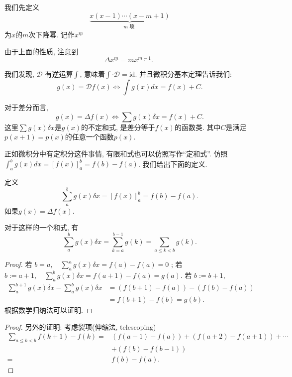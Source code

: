 \documentclass{ctexart}
\begin{document}
我们先定义
$$
	\underbrace{x(x-1) \cdots(x-m+1)}_{m \text { 项 }}
$$
为$x$的$m$次下降幂. 记作$x^{\underline m}$

\begin{proposition}
	由于上面的性质, 注意到
	$$
		\Delta x^{\underline{m}}=m x^{\underline{m-1}} \text {. }
	$$
\end{proposition}

我们发现, $\mathscr D$ 有逆运算$\int$, 意味着$\int \cdot \mathscr D=\text{id}$. 并且微积分基本定理告诉我们:
$$
	g(x)=\mathscr D f(x) \Leftrightarrow \int g(x) d x=f(x)+C .
$$

\begin{theorem}[差分基本定理] 对于差分而言,
	$$
		g(x)=\Delta f(x) \Leftrightarrow \sum g(x) \delta x=f(x)+C .
	$$
	这里$\sum g(x) \delta x$是$g(x)$的不定和式, 是差分等于$f(x)$的函数类. 其中$C$是满足$p(x+1)=p(x)$的任意一个函数$p(x)$.
\end{theorem}

正如微积分中有定积分这件事情, 有限和式也可以仿照写作``定和式''. 仿照
$\int_a^b g(x) d x=[f(x)]_a^b=f(b)-f(a)$.
我们给出下面的定义.

\begin{definition}[定和式]
	定义
	$$
		\sum_a^b g(x) \delta x=[f(x)]_a^b=f(b)-f(a) .
	$$
	如果$g(x)=\Delta f(x) .$

\end{definition}

\begin{proposition}
	对于这样的一个和式, 有
	$$
		\sum_a^b g(x) \delta x=\sum_{k=a}^{b-1} g(k)=\sum_{a \leq k<b} g(k) .
	$$

\end{proposition}

\begin{proof}
	若 $b=a , \quad \sum_a^a g(x) \delta x=f(a)-f(a)=0$ ;
	若 $b:=a+1, \quad \sum_a^b g(x) \delta x=f(a+1)-f(a)=g(a)$.
	若 $b:=b+1$,
	$$
		\begin{aligned}
			\sum_a^{b+1} g(x) \delta x-\sum_a^b g(x) \delta x & =(f(b+1)-f(a))-(f(b)-f(a)) \\
			                                                  & =f(b+1)-f(b)=g(b) .
		\end{aligned}
	$$
	根据数学归纳法可以证明.
\end{proof}

\begin{proof}
	另外的证明: 考虑裂项(伸缩法, telescoping)
	$$
		\begin{aligned}
			\sum_{a \leq k<b} f(k+1)-f(k)= & (f(a-1)-f(a))+(f(a+2)-f(a+1))+\cdots \\
			                               & +(f(b)-f(b-1))                       \\
			=                              & f(b)-f(a) .
		\end{aligned}
	$$
\end{proof}
\end{document}

